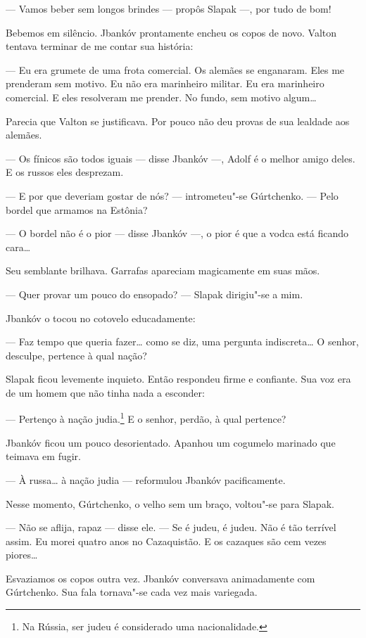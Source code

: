 --- Vamos beber sem longos brindes --- propôs Slapak ---, por tudo de
bom!

Bebemos em silêncio. Jbankóv prontamente encheu os copos de novo. Valton
tentava terminar de me contar sua história:

--- Eu era grumete de uma frota comercial. Os alemães se enganaram. Eles
me prenderam sem motivo. Eu não era marinheiro militar. Eu era
marinheiro comercial. E eles resolveram me prender. No fundo, sem motivo
algum\ldots{}

Parecia que Valton se justificava. Por pouco não deu provas de sua
lealdade aos alemães.

--- Os fínicos são todos iguais --- disse Jbankóv ---, Adolf é o melhor
amigo deles. E os russos eles desprezam.

--- E por que deveriam gostar de nós? --- intrometeu"-se Gúrtchenko. ---
Pelo bordel que armamos na Estônia?

--- O bordel não é o pior --- disse Jbankóv ---, o pior é que a vodca
está ficando cara\ldots{}

Seu semblante brilhava. Garrafas apareciam magicamente em suas mãos.

--- Quer provar um pouco do ensopado? --- Slapak dirigiu"-se a mim.

Jbankóv o tocou no cotovelo educadamente:

--- Faz tempo que queria fazer\ldots{} como se diz, uma pergunta
indiscreta\ldots{} O senhor, desculpe, pertence à qual nação?

Slapak ficou levemente inquieto. Então respondeu firme e confiante. Sua
voz era de um homem que não tinha nada a esconder:

--- Pertenço à nação judia.\footnote{Na Rússia, ser judeu é considerado uma nacionalidade.} E o senhor, perdão, à qual pertence?

Jbankóv ficou um pouco desorientado. Apanhou um cogumelo marinado que teimava em fugir.

--- À russa\ldots{} à nação judia --- reformulou Jbankóv pacificamente.

Nesse momento, Gúrtchenko, o velho sem um braço, voltou"-se para Slapak.

--- Não se aflija, rapaz --- disse ele. --- Se é judeu, é judeu. Não é
tão terrível assim. Eu morei quatro anos no Cazaquistão. E os cazaques
são cem vezes piores\ldots{}

Esvaziamos os copos outra vez. Jbankóv conversava animadamente com
Gúrtchenko. Sua fala tornava"-se cada vez mais variegada.


